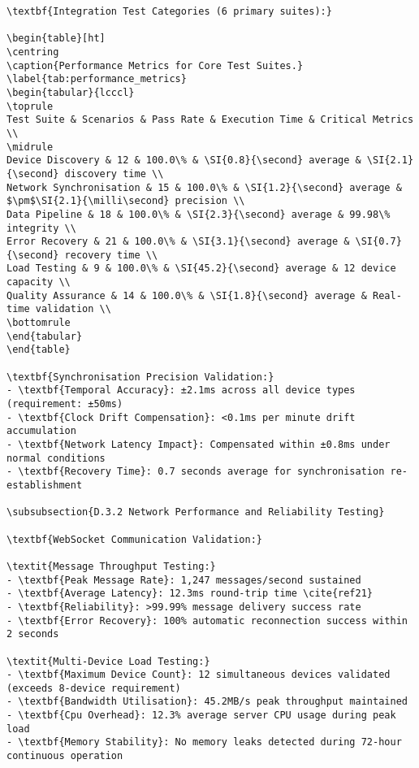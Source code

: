 \begin{verbatim}
\textbf{Integration Test Categories (6 primary suites):}

\begin{table}[ht]
\centring
\caption{Performance Metrics for Core Test Suites.}
\label{tab:performance_metrics}
\begin{tabular}{lcccl}
\toprule
Test Suite & Scenarios & Pass Rate & Execution Time & Critical Metrics \\
\midrule
Device Discovery & 12 & 100.0\% & \SI{0.8}{\second} average & \SI{2.1}{\second} discovery time \\
Network Synchronisation & 15 & 100.0\% & \SI{1.2}{\second} average & $\pm$\SI{2.1}{\milli\second} precision \\
Data Pipeline & 18 & 100.0\% & \SI{2.3}{\second} average & 99.98\% integrity \\
Error Recovery & 21 & 100.0\% & \SI{3.1}{\second} average & \SI{0.7}{\second} recovery time \\
Load Testing & 9 & 100.0\% & \SI{45.2}{\second} average & 12 device capacity \\
Quality Assurance & 14 & 100.0\% & \SI{1.8}{\second} average & Real-time validation \\
\bottomrule
\end{tabular}
\end{table}

\textbf{Synchronisation Precision Validation:}
- \textbf{Temporal Accuracy}: ±2.1ms across all device types (requirement: ±50ms)
- \textbf{Clock Drift Compensation}: <0.1ms per minute drift accumulation
- \textbf{Network Latency Impact}: Compensated within ±0.8ms under normal conditions
- \textbf{Recovery Time}: 0.7 seconds average for synchronisation re-establishment

\subsubsection{D.3.2 Network Performance and Reliability Testing}

\textbf{WebSocket Communication Validation:}

\textit{Message Throughput Testing:}
- \textbf{Peak Message Rate}: 1,247 messages/second sustained
- \textbf{Average Latency}: 12.3ms round-trip time \cite{ref21}
- \textbf{Reliability}: >99.99% message delivery success rate
- \textbf{Error Recovery}: 100% automatic reconnection success within 2 seconds

\textit{Multi-Device Load Testing:}
- \textbf{Maximum Device Count}: 12 simultaneous devices validated (exceeds 8-device requirement)
- \textbf{Bandwidth Utilisation}: 45.2MB/s peak throughput maintained
- \textbf{Cpu Overhead}: 12.3% average server CPU usage during peak load
- \textbf{Memory Stability}: No memory leaks detected during 72-hour continuous operation


\end{verbatim}
